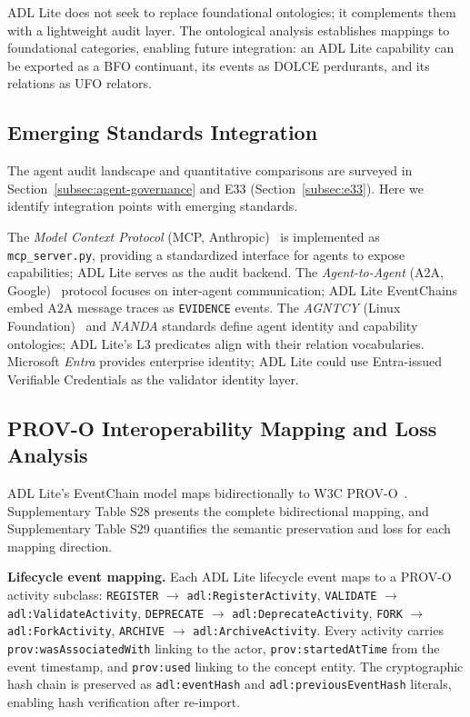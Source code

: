 ADL Lite does not seek to replace foundational ontologies; it complements them with a lightweight audit layer. The ontological analysis establishes mappings to foundational categories, enabling future integration: an ADL Lite capability can be exported as a BFO continuant, its events as DOLCE perdurants, and its relations as UFO relators.

\subsection{Emerging Standards Integration}\label{subsec:complementary-systems}

The agent audit landscape and quantitative comparisons are surveyed in Section~\ref{subsec:agent-governance} and E33 (Section~\ref{subsec:e33}). Here we identify integration points with emerging standards.

The \emph{Model Context Protocol} (MCP, Anthropic)~\cite{mcp2024anthropic} is implemented as \texttt{mcp\_server.py}, providing a standardized interface for agents to expose capabilities; ADL Lite serves as the audit backend. The \emph{Agent-to-Agent} (A2A, Google)~\cite{a2a2025google} protocol focuses on inter-agent communication; ADL Lite EventChains embed A2A message traces as \texttt{EVIDENCE} events. The \emph{AGNTCY} (Linux Foundation)~\cite{agntcy2025linux} and \emph{NANDA} standards define agent identity and capability ontologies; ADL Lite's L3 predicates align with their relation vocabularies. Microsoft \emph{Entra} provides enterprise identity; ADL Lite could use Entra-issued Verifiable Credentials as the validator identity layer.

\subsection{PROV-O Interoperability Mapping and Loss Analysis}\label{subsec:prov-mapping}

ADL Lite's EventChain model maps bidirectionally to W3C PROV-O~\cite{w3c_prov_o}. Supplementary Table S28 presents the complete bidirectional mapping, and Supplementary Table S29 quantifies the semantic preservation and loss for each mapping direction.

\textbf{Lifecycle event mapping.} Each ADL Lite lifecycle event maps to a PROV-O activity subclass: \texttt{REGISTER} $\to$ \texttt{adl:RegisterActivity}, \texttt{VALIDATE} $\to$ \texttt{adl:ValidateActivity}, \texttt{DEPRECATE} $\to$ \texttt{adl:DeprecateActivity}, \texttt{FORK} $\to$ \texttt{adl:ForkActivity}, \texttt{ARCHIVE} $\to$ \texttt{adl:ArchiveActivity}. Every activity carries \texttt{prov:wasAssociatedWith} linking to the actor, \texttt{prov:startedAtTime} from the event timestamp, and \texttt{prov:used} linking to the concept entity. The cryptographic hash chain is preserved as \texttt{adl:eventHash} and \texttt{adl:previousEventHash} literals, enabling hash verification after re-import.

